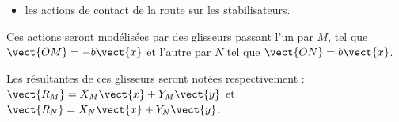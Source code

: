\begin{itemize}
\item les actions de contact de la route sur les stabilisateurs.
\end{itemize}


 Ces actions seront modélisées par des glisseurs passant l’un par $M$, tel que $\vect{OM}=-b\vect{x}$ et l’autre par $N$ tel que $\vect{ON}=b\vect{x}$.
 
 Les résultantes de ces glisseurs seront notées respectivement : $\vect{R_M} = X_M \vect{x} +  Y_M \vect{y}$ et  
 $\vect{R_N} = X_N \vect{x} +  Y_N \vect{y}$.
 


 \ifprof
 \begin{corrige}
 \end{corrige}
 \else
 \fi

 \ifprof
 \begin{corrige}
 \end{corrige}
 \else
 \fi
